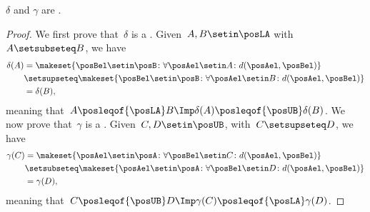 {    \begin{lemma}
        \label{lem:deltagammamonotone}
        $\delta$ and $\gamma$ are .
    \end{lemma}
    \begin{proof}
        We first prove that~$\delta$ is a .
        Given~$A,B\setin \posLA$ with~$A\setsubseteq B$, we have
        \begin{equation}
            \begin{aligned}
                \delta(A) & =\makeset{\posBel\setin \posB\colon \forall \posAel \setin A\colon d(\posAel,\posBel)} \\
                          & \setsupseteq \makeset{\posBel\setin \posB\colon \forall \posAel\setin B \colon d(\posAel,\posBel)} \\
                          & =\delta(B),
            \end{aligned}
        \end{equation}
        meaning that~$A\posleqof{\posLA}
            B \Imp \delta(A)\posleqof{\posUB} \delta(B)$.
        We now prove that~$\gamma$ is a .
        Given~$C,D\setin \posUB$, with~$C\setsupseteq D$, we have
        \begin{equation}
            \begin{aligned}
                \gamma(C) & =\makeset{\posAel\setin \posA\colon \forall \posBel \setin C\colon d(\posAel,\posBel)} \\
                          & \setsubseteq \makeset{\posAel\setin \posA\colon \forall \posBel \setin D \colon d(\posAel,\posBel)} \\
                          & =\gamma(D),
            \end{aligned}
        \end{equation}
        meaning that~$C\posleqof{\posUB}
            D \Imp \gamma(C)\posleqof{\posLA} \gamma(D)$.
    \end{proof}

}
